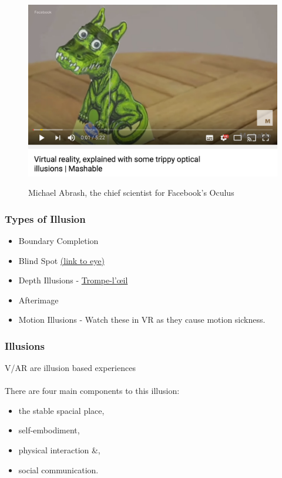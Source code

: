 \begin{frame}
	\begin{figure}
		\href{https://www.youtube.com/watch?v=qD3w3cAhEYU}{ \includegraphics[scale=.4]{assets/optical}  }
		\caption{Michael Abrash, the chief scientist for Facebook's Oculus}
	\end{figure}
\end{frame}


\begin{frame}
	\frametitle{Types of Illusion}
	\begin{itemize}
		\item Boundary Completion
		\item Blind Spot \href{http://snowbrains.com/wp-content/uploads/2013/07/eyeball.jpg}{ (link to eye)}
		\item Depth Illusions - \href{https://www.youtube.com/watch?v=QmMTwjUdqbg}{Trompe-l'\oe il}
		\item Afterimage
		\item Motion Illusions - Watch these in VR as they cause motion sickness. 
	\end{itemize}
\end{frame}

\begin{frame}
	\frametitle{Illusions}
	V/AR are illusion based experiences \\~\\ 
	
	There are four main components to this illusion:
	\begin{itemize}
		\item the stable spacial place,
		\item self-embodiment,
		\item physical interaction \&,
		\item social communication.
	\end{itemize}
\end{frame}


